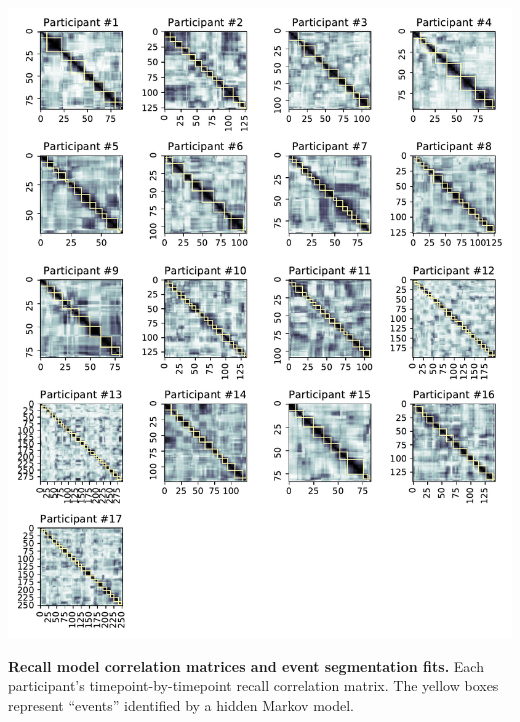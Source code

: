 \documentclass{article}
\begin{document}
{%
\begin{suppfigure}[t!]
\centering
\includegraphics[width=1\textwidth]{figs/supp1_corrmats.pdf}
\caption{\small \textbf{Recall model correlation matrices and event segmentation fits.} Each participant's timepoint-by-timepoint recall correlation matrix.  The yellow boxes represent ``events'' identified by a hidden Markov model.}
\label{fig:corrmats}
\end{suppfigure}

}
\end{document}
